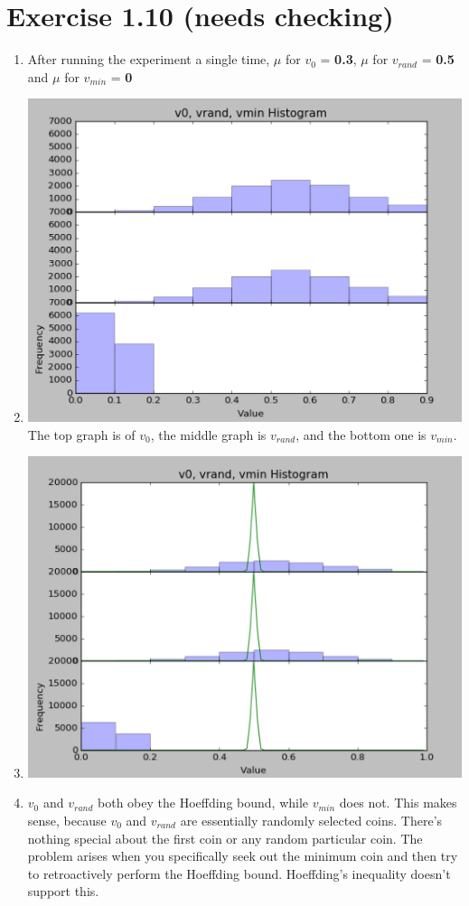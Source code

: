 \documentclass[12pt]{article}
\begin{document}
\section*{Exercise 1.10 (needs checking)}
\begin{enumerate}[label=(\alph*)]
	\item After running the experiment a single time, $\mu$ for $v_0$ = \textbf{0.3}, $\mu$ for $v_{rand}$ = \textbf{0.5} and $\mu$ for $v_{min}$ = \textbf{0}
	\item \includegraphics[scale=.5]{1-10-1.png}
	The top graph is of $v_0$, the middle graph is $v_{rand}$, and the bottom one is $v_{min}$.
	\item \includegraphics[scale=.5]{1-10-2.png}
	\item $v_0$ and $v_{rand}$ both obey the Hoeffding bound, while $v_{min}$ does not. This makes sense, because $v_0$ and $v_{rand}$ are essentially randomly selected coins. There's nothing special about the first coin or any random particular coin. The problem arises when you specifically seek out the minimum coin and then try to retroactively perform the Hoeffding bound. Hoeffding's inequality doesn't support this.

\end{enumerate}
\end{document}

